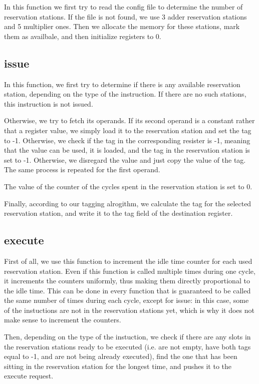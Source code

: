 In this function we first try to read the config file to determine the number of reservation stations. If the file is not found, we use 3 adder reservation stations and 5 multiplier ones. Then we allocate the memory for these stations, mark them as availbale, and then initialize registers to 0.

\subsection{issue}

In this function, we first try to determine if there is any available reservation station, depending on the type of the instruction. If there are no such stations, this instruction is not issued.

Otherwise, we try to fetch its operands. If its second operand is a constant rather that a register value, we simply load it to the reservation station and set the tag to -1. Otherwise, we check if the tag in the corresponding resister is -1, meaning that the value can be used, it is loaded, and the tag in the reservation station is set to -1. Otherwise, we disregard the value and just copy the value of the tag. The same process is repeated for the first operand.

The value of the counter of the cycles spent in the reservation station is set to 0.

Finally, according to our tagging alrogithm, we calculate the tag for the selected reservation station, and write it to the tag field of the destination register.

\subsection{execute}

First of all, we use this function to increment the idle time counter for each used reservation station. Even if this function is called multiple times during one cycle, it increments the counters uniformly, thus making them directly proportional to the idle time. This can be done in every function that is guaranteed to be called the same number of times during each cycle, except for issue: in this case, some of the instuctions are not in the reservation stations yet, which is why it does not make sense to increment the counters.

Then, depending on the type of the instuction, we check if there are any slots in the reservation stations ready to be executed (i.e. are not empty, have both tags equal to -1, and are not being already executed), find the one that has been sitting in the reservation station for the longest time, and pushes it to the execute request.

